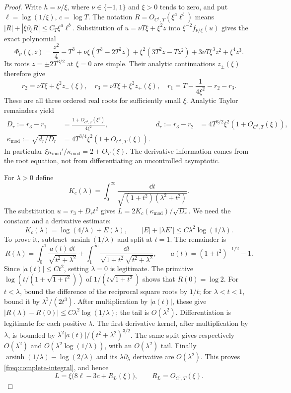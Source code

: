 \begin{proof}
Write $h=\nu/\xi$, where $\nu\in\{-1,1\}$ and $\xi>0$ tends to
zero, and put $\ell=\log(1/\xi)$, $c=\log T$.
The notation $R=O_{C^1,T}(\xi^a\ell^b)$ means
$|R|+|\xi\partial_\xi R|\le C_T\xi^a\ell^b$.
Substitution of $u=\nu T\xi+\xi^2z$ into $\xi^{-2}f_{\nu/\xi}(u)$
gives the exact polynomial
\[
 \Phi_\nu(\xi,z)=\frac{z^2}{4}-T^3
 +\nu\xi(T^3-2T^2z)+\xi^2(3T^2z-Tz^2)
 +3\nu T\xi^3z^2+\xi^4z^3.
\]
Its roots $z=\pm2T^{3/2}$ at $\xi=0$ are simple.  Their analytic
continuations $z_\pm(\xi)$ therefore give
\[
 r_2=\nu T\xi+\xi^2z_-(\xi),\quad
 r_3=\nu T\xi+\xi^2z_+(\xi),\quad
 r_1=T-\frac1{4\xi^2}-r_2-r_3.
\]
These are all three ordered real roots for sufficiently small $\xi$.
Analytic Taylor remainders yield
\begin{equation}\label{freq:root-scales}
 \begin{aligned}
 D_r:=r_3-r_1&=\frac{1+O_{C^1,T}(\xi^2)}{4\xi^2},&
 d_r:=r_3-r_2&=4T^{3/2}\xi^2(1+O_{C^1,T}(\xi)),\\
 \kappa_{\mathrm{mod}}:=\sqrt{d_r/D_r}
 &=4T^{3/4}\xi^2(1+O_{C^1,T}(\xi)).
 \end{aligned}
\end{equation}
In particular $\xi\kappa_{\mathrm{mod}}'/\kappa_{\mathrm{mod}}
=2+O_T(\xi)$.  The derivative information comes from the root
equation, not from differentiating an uncontrolled asymptotic.

For $\lambda>0$ define
\[
 K_c(\lambda)=\int_0^\infty
 \frac{\dd t}{\sqrt{(1+t^2)(\lambda^2+t^2)}}.
\]
The substitution $u=r_3+D_rt^2$ gives
$L=2K_c(\kappa_{\mathrm{mod}})/\sqrt{D_r}$.
We need the constant and a derivative estimate:
\begin{equation}\label{freq:complete-integral}
 K_c(\lambda)=\log(4/\lambda)+E(\lambda),\qquad
 |E|+|\lambda E'|\le C\lambda^2\log(1/\lambda).
\end{equation}
To prove it, subtract $\operatorname{arsinh}(1/\lambda)$ and split
at $t=1$.  The remainder is
\[
 R(\lambda)=\int_0^1\frac{a(t)\,\dd t}{\sqrt{t^2+\lambda^2}}
 +\int_1^\infty\frac{\dd t}{\sqrt{1+t^2}\sqrt{t^2+\lambda^2}},
 \qquad a(t)=(1+t^2)^{-1/2}-1.
\]
Since $|a(t)|\le Ct^2$, setting $\lambda=0$ is legitimate.
The primitive
$\log(t/(1+\sqrt{1+t^2}))$ of $1/(t\sqrt{1+t^2})$
shows that $R(0)=\log2$.
For $t<\lambda$, bound the difference of the reciprocal square roots
by $1/t$; for $\lambda<t<1$, bound it by $\lambda^2/(2t^3)$.
After multiplication by $|a(t)|$, these give
$|R(\lambda)-R(0)|\le C\lambda^2\log(1/\lambda)$; the tail is
$O(\lambda^2)$.  Differentiation is legitimate for each positive
$\lambda$.  The first derivative kernel, after multiplication by
$\lambda$, is bounded by
$\lambda^2|a(t)|/(t^2+\lambda^2)^{3/2}$.
The same split gives respectively $O(\lambda^2)$ and
$O(\lambda^2\log(1/\lambda))$, with an $O(\lambda^2)$ tail.
Finally $\operatorname{arsinh}(1/\lambda)-\log(2/\lambda)$ and its
$\lambda\partial_\lambda$ derivative are $O(\lambda^2)$.
This proves \eqref{freq:complete-integral}, and hence
\begin{equation}\label{freq:period-C1}
 L=\xi\bigl(8\ell-3c+R_L(\xi)\bigr),\qquad
 R_L=O_{C^1,T}(\xi).
\end{equation}


\end{proof}
